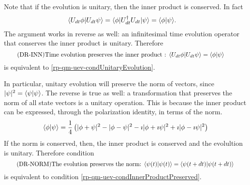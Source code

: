 Note that if the evolution is unitary, then the inner product is conserved. In fact
\begin{equation}
	\begin{aligned}
		\langle U_{dt} \phi | U_{dt} \psi\rangle &= \langle \phi | U^\dagger_{dt} U_{dt} | \psi \rangle =\langle  \phi | \psi \rangle.
	\end{aligned}
\end{equation}
The argument works in reverse as well: an infinitesimal time evolution operator that conserves the inner product is unitary. Therefore
\begin{equation}\label{rp-qm-uev-condInnerProductPreserved}
	\tag{DR-INN}
	\eqtext{Time evolution preserves the inner product : $\< U_{dt} \phi | U_{dt} \psi\> =\<  \phi | \psi \>$} 
\end{equation}
is equivalent to \ref{rp-qm-uev-condUnitaryEvolution}.

In particular, unitary evolution will preserve the norm of vectors, since $|\psi|^2 = \langle\psi | \psi \rangle$. The reverse is true as well: a transformation that preserves the norm of all state vectors is a unitary operation. This is because the inner product can be expressed, through the polarization identity, in terms of the norm.
\begin{equation}
	\begin{aligned}
		\langle \phi | \psi \rangle = \frac{1}{4}\left( |\phi + \psi|^2 - |\phi - \psi|^2 - \imath |\phi + \imath \psi|^2 +\imath |\phi - \imath \psi|^2 \right)
	\end{aligned}
\end{equation}
If the norm is conserved, then, the inner product is conserved and the evolultion is unitary. Therefore condition
\begin{equation}\label{rp-qm-uev-condNormalized}
	\tag{DR-NORM}
	\eqtext{The evolution preserves the norm: $\< \psi(t) | \psi(t) \> = \< \psi(t+dt) | \psi(t+dt) \>$} 
\end{equation}
is equivalent to condition \ref{rp-qm-uev-condInnerProductPreserved}.

